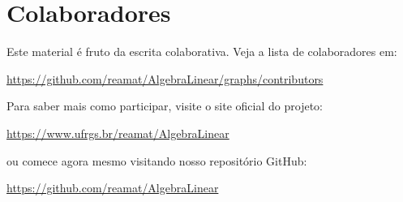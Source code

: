 
%
%
%

\chapter*{Colaboradores}

Este material é fruto da escrita colaborativa. Veja a lista de colaboradores em:
\begin{center}
  \url{https://github.com/reamat/AlgebraLinear/graphs/contributors}
\end{center}

Para saber mais como participar, visite o site oficial do projeto:
\begin{center}
  \url{https://www.ufrgs.br/reamat/AlgebraLinear}
\end{center}
ou comece agora mesmo visitando nosso repositório GitHub:
\begin{center}
  \url{https://github.com/reamat/AlgebraLinear}
\end{center}
